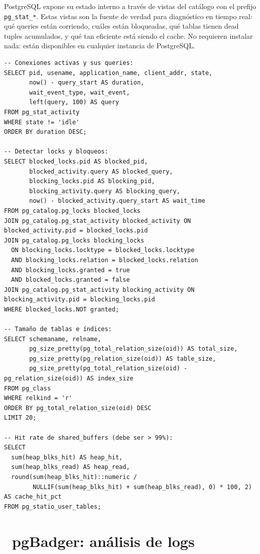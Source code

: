PostgreSQL expone su estado interno a través de vistas del catálogo con el prefijo \texttt{pg\_stat\_*}.
Estas vistas son la fuente de verdad para diagnóstico en tiempo real: qué queries están corriendo, cuáles están bloqueadas, qué tablas tienen dead tuples acumulados, y qué tan eficiente está siendo el cache.
No requieren instalar nada: están disponibles en cualquier instancia de PostgreSQL.

\begin{lstlisting}[caption={Queries críticas de monitoreo}]
-- Conexiones activas y sus queries:
SELECT pid, usename, application_name, client_addr, state,
       now() - query_start AS duration,
       wait_event_type, wait_event,
       left(query, 100) AS query
FROM pg_stat_activity
WHERE state != 'idle'
ORDER BY duration DESC;

-- Detectar locks y bloqueos:
SELECT blocked_locks.pid AS blocked_pid,
       blocked_activity.query AS blocked_query,
       blocking_locks.pid AS blocking_pid,
       blocking_activity.query AS blocking_query,
       now() - blocked_activity.query_start AS wait_time
FROM pg_catalog.pg_locks blocked_locks
JOIN pg_catalog.pg_stat_activity blocked_activity ON blocked_activity.pid = blocked_locks.pid
JOIN pg_catalog.pg_locks blocking_locks
  ON blocking_locks.locktype = blocked_locks.locktype
  AND blocking_locks.relation = blocked_locks.relation
  AND blocking_locks.granted = true
  AND blocked_locks.granted = false
JOIN pg_catalog.pg_stat_activity blocking_activity ON blocking_activity.pid = blocking_locks.pid
WHERE blocked_locks.NOT granted;

-- Tamaño de tablas e índices:
SELECT schemaname, relname,
       pg_size_pretty(pg_total_relation_size(oid)) AS total_size,
       pg_size_pretty(pg_relation_size(oid)) AS table_size,
       pg_size_pretty(pg_total_relation_size(oid) - pg_relation_size(oid)) AS index_size
FROM pg_class
WHERE relkind = 'r'
ORDER BY pg_total_relation_size(oid) DESC
LIMIT 20;

-- Hit rate de shared_buffers (debe ser > 99%):
SELECT
  sum(heap_blks_hit) AS heap_hit,
  sum(heap_blks_read) AS heap_read,
  round(sum(heap_blks_hit)::numeric /
        NULLIF(sum(heap_blks_hit) + sum(heap_blks_read), 0) * 100, 2) AS cache_hit_pct
FROM pg_statio_user_tables;
\end{lstlisting}

\section[pgBadger: análisis de logs]{~pgBadger: análisis de logs}

